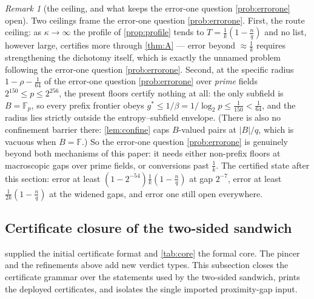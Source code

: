 \documentclass[11pt]{article}
\theoremstyle{definition}
\theoremstyle{remark}
\newtheorem{remark}[remark]{Remark}
\newcommand{\F}{\mathbb{F}}
\newcommand{\B}{B}
\begin{document}
\begin{remark}[the ceiling, and what keeps the error-one question \cref{prob:errorone} open]\label{rem:profile-ceiling}
Two ceilings frame the error-one question \cref{prob:errorone}. First, the route ceiling: as $\kappa\to\infty$ the profile of \cref{prop:profile} tends to $T=\frac1k(1-\frac nq)$ and no list, however large, certifies more through \cref{thm:A} --- error beyond $\approx\frac1k$ requires strengthening the dichotomy itself, which is exactly the unnamed problem following the error-one question \cref{prob:errorone}. Second, at the specific radius $1-\rho-\frac1{64}$ of the error-one question \cref{prob:errorone} over \emph{prime} fields $2^{150}\le p\le2^{256}$, the present floors certify nothing at all: the only subfield is $\B=\F_p$, so every prefix frontier obeys $g^*\le1/\beta=1/\log_2p\le\frac1{150}<\frac1{64}$, and the radius lies strictly outside the entropy--subfield envelope. \textup(There is also no confinement barrier there: \cref{lem:confine} caps $\B$-valued pairs at $|\B|/q$, which is vacuous when $\B=\F$.\textup) So the error-one question \cref{prob:errorone} is genuinely beyond both mechanisms of this paper: it needs either non-prefix floors at macroscopic gaps over prime fields, or conversions past $\frac1k$. The certified state after this section: error at least $(1-2^{-54})\frac1k(1-\frac nq)$ at gap $2^{-7}$, error at least $\frac1{2k}(1-\frac nq)$ at the widened gaps, and error one still open everywhere.
\end{remark}

\subsection{Certificate closure of the two-sided sandwich}\label{sec:answers-T7}

 supplied the initial certificate format and \cref{tab:core} the formal core.  The pincer and the refinements above add new verdict types.  This subsection closes the certificate grammar over the statements used by the two-sided sandwich, prints the deployed certificates, and isolates the single imported proximity-gap input.
\end{document}
